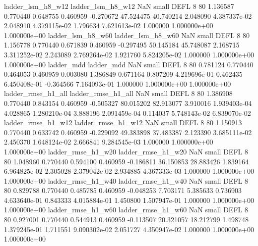        ladder_lsm_h8_w12        ladder_lsm_h8_w12                   NaN      small     DEFL                 8 80 1.136587       0.770440 0.648755       0.460959   -0.270672     47.524475     40.740214     2.048090   4.387337e-02  2.048910 4.379115e-02     1.796634   7.621613e-02            1.000000    1.000000e+00        1.000000e+00
       ladder_lsm_h8_w60        ladder_lsm_h8_w60                   NaN      small     DEFL                 8 80 1.156778       0.770440 0.671839       0.460959   -0.297495     50.145184     45.748087     2.168715   3.311252e-02  2.243089 2.769264e-02     1.921760   5.824205e-02            1.000000    1.000000e+00        1.000000e+00
              ladder_mdd               ladder_mdd                   NaN      small     DEFL                 8 80 0.781124       0.770440 0.464053       0.460959    0.003080      1.386849      0.671164     0.807209   4.219696e-01  0.462435 6.450408e-01    -0.364566   7.164093e-01            1.000000    1.000000e+00        1.000000e+00
      ladder_rmse_h1_all       ladder_rmse_h1_all                   NaN      small     DEFL                 8 80 1.386908       0.770440 0.843154       0.460959   -0.505327     80.015202     82.913077     3.910016   1.939403e-04  4.028865 1.280210e-04     3.888196   2.091459e-04            0.114037    5.748143e-02        6.839070e-02
      ladder_rmse_h1_w12       ladder_rmse_h1_w12                   NaN      small     DEFL                 8 80 1.150913       0.770440 0.633742       0.460959   -0.229092     49.383898     37.483387     2.123390   3.685111e-02  2.450370 1.648124e-02     2.666841   9.284545e-03            1.000000    1.000000e+00        1.000000e+00
      ladder_rmse_h1_w20       ladder_rmse_h1_w20                   NaN      small     DEFL                 8 80 1.048960       0.770440 0.594100       0.460959   -0.186811     36.150853     28.883426     1.839164   6.964825e-02  2.305028 2.379042e-02     2.934885   4.367333e-03            1.000000    1.000000e+00        1.000000e+00
      ladder_rmse_h1_w40       ladder_rmse_h1_w40                   NaN      small     DEFL                 8 80 0.829788       0.770440 0.485785       0.460959   -0.048253      7.703171      5.385633     0.736903   4.633640e-01  0.843333 4.015884e-01     1.450800   1.507947e-01            1.000000    1.000000e+00        1.000000e+00
      ladder_rmse_h1_w60       ladder_rmse_h1_w60                   NaN      small     DEFL                 8 80 0.927001       0.770440 0.544913       0.460959   -0.113507     20.321057     18.212799     1.498748   1.379245e-01  1.711551 9.090302e-02     2.051727   4.350947e-02            1.000000    1.000000e+00        1.000000e+00

